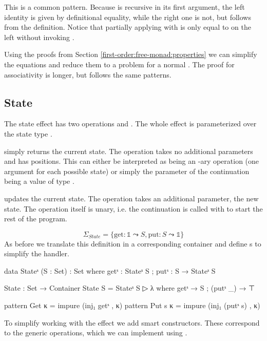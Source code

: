 This is a common pattern.
Because \AgdaFunction{++} is recursive in its first argument, the left
identity is given by definitional equality, while the right one is not, but
follows from the definition.
Notice that partially applying \AgdaFunction{++} with
\AgdaInductiveConstructor{[]} is only equal to  on the left
without invoking .

Using the proofs from Section \ref{first-order:free-monad:properties} we
can simplify the equations and reduce them to a problem for a normal
.
The proof for associativity is longer, but follows the same patterns.


\subsection{State}

The state effect has two operations  and .
The whole effect is parameterized over the state type .

 simply returns the current state.
The operation takes no additional parameters and has  positions.
This can either be interpreted as  being an
-ary operation (one argument for each possible state) or
simply the parameter of the continuation being a value of type .

 updates the current state.
The operation takes an additional parameter, the new state.
The operation itself is unary, i.e. the continuation is called with
 to start the rest of the program.

$$
\Sigma_{State} = \{ \mathrm{get} : \mathbb{1} \leadsto S, \mathrm{put} :
S \leadsto \mathbb{1} \}
$$
As before we translate this definition in a corresponding container and
define s to simplify the handler.

\begin{code}
data Stateˢ (S : Set) : Set where getˢ : Stateˢ S ; putˢ : S → Stateˢ S

State : Set → Container
State S = Stateˢ S ▷ λ where getˢ → S ; (putˢ _) → ⊤

pattern Get κ    = impure (inj₁ getˢ      , κ)
pattern Put s κ  = impure (inj₁ (putˢ s)  , κ)
\end{code}
To simplify working with the  effect we add smart
constructors.
These correspond to the generic operations, which we can implement using
.

